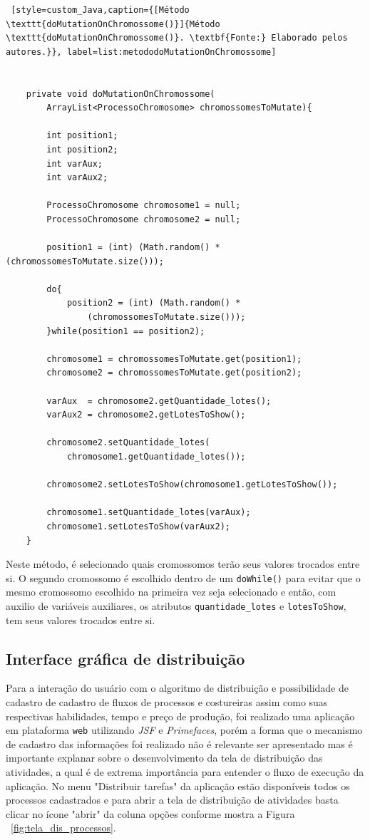 \begin{lstlisting} [style=custom_Java,caption={[Método \texttt{doMutationOnChromossome()}]{Método \texttt{doMutationOnChromossome()}. \textbf{Fonte:} Elaborado pelos autores.}}, label=list:metododoMutationOnChromossome] 


	private void doMutationOnChromossome(
		ArrayList<ProcessoChromosome> chromossomesToMutate){
	
		int position1;
		int position2;
		int varAux;
		int varAux2;
		
		ProcessoChromosome chromosome1 = null;
		ProcessoChromosome chromosome2 = null;
		
		position1 = (int) (Math.random() * (chromossomesToMutate.size()));
		
		do{
			position2 = (int) (Math.random() * 
				(chromossomesToMutate.size()));
		}while(position1 == position2);
	
		chromosome1 = chromossomesToMutate.get(position1);
		chromosome2 = chromossomesToMutate.get(position2);
		
		varAux  = chromosome2.getQuantidade_lotes();
		varAux2 = chromosome2.getLotesToShow();
		
		chromosome2.setQuantidade_lotes(
			chromosome1.getQuantidade_lotes());
			
		chromosome2.setLotesToShow(chromosome1.getLotesToShow());
		
		chromosome1.setQuantidade_lotes(varAux);
		chromosome1.setLotesToShow(varAux2);
	}

\end{lstlisting}

\par Neste método, é selecionado quais cromossomos terão seus valores trocados entre si. O segundo cromossomo é escolhido dentro de um
\texttt{doWhile()} para evitar que o mesmo cromossomo escolhido na primeira vez seja selecionado e então, com auxilio de variáveis
auxiliares, os atributos \texttt{quantidade\_lotes} e \texttt{lotesToShow}, tem seus valores trocados entre si.

\subsection{Interface gráfica de distribuição} 

\par Para a interação do usuário com o algoritmo de distribuição e possibilidade de cadastro de cadastro de fluxos de processos e 
costureiras assim como suas respectivas habilidades, tempo e preço de produção, foi realizado uma aplicação em plataforma \texttt{web}
utilizando \textit{JSF} e \textit{Primefaces}, porém a forma que o mecanismo de cadastro das informações foi realizado não é relevante
ser apresentado mas é importante explanar sobre o desenvolvimento da tela de distribuição das atividades, a qual é de extrema importância para 
entender o fluxo de execução da aplicação. No menu "Distribuir tarefas" da aplicação estão disponíveis todos os processos cadastrados e
para abrir a tela de distribuição de atividades basta clicar no ícone "abrir" da coluna opções conforme mostra a Figura ~\ref{fig:tela_dis_processos}.

